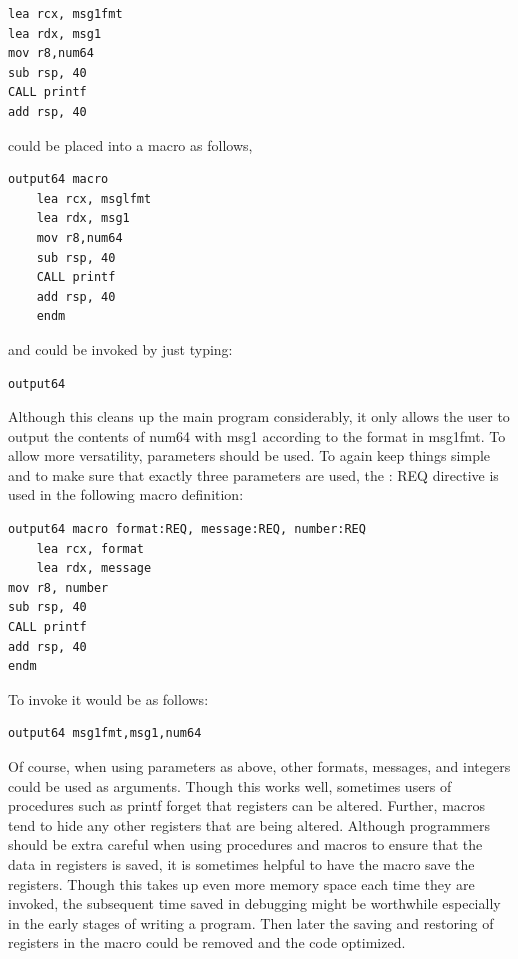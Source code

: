 \documentclass[10pt]{article}
\begin{document}
\begin{verbatim}
lea rcx, msg1fmt
lea rdx, msg1
mov r8,num64
sub rsp, 40
CALL printf
add rsp, 40
\end{verbatim}

could be placed into a macro as follows,

\begin{verbatim}
output64 macro
    lea rcx, msglfmt
    lea rdx, msg1
    mov r8,num64
    sub rsp, 40
    CALL printf
    add rsp, 40
    endm
\end{verbatim}

and could be invoked by just typing:

\begin{verbatim}
output64
\end{verbatim}

Although this cleans up the main program considerably, it only allows the user to output the contents of num64 with msg1 according to the format in msg1fmt. To allow more versatility, parameters should be used. To again keep things simple and to make sure that exactly three parameters are used, the : REQ directive is used in the following macro definition:

\begin{verbatim}
output64 macro format:REQ, message:REQ, number:REQ
    lea rcx, format
    lea rdx, message
mov r8, number
sub rsp, 40
CALL printf
add rsp, 40
endm
\end{verbatim}

To invoke it would be as follows:

\begin{verbatim}
output64 msg1fmt,msg1,num64
\end{verbatim}

Of course, when using parameters as above, other formats, messages, and integers could be used as arguments. Though this works well, sometimes users of procedures such as printf forget that registers can be altered. Further, macros tend to hide any other registers that are being altered. Although programmers should be extra careful when using procedures and macros to ensure that the data in registers is saved, it is sometimes helpful to have the macro save the registers. Though this takes up even more memory space each time they are invoked, the subsequent time saved in debugging might be worthwhile especially in the early stages of writing a program. Then later the saving and restoring of registers in the macro could be removed and the code optimized.
\end{document}
